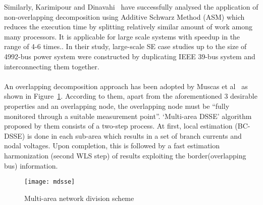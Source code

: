 \documentclass[thesis.tex]{subfiles}
\begin{document}
Similarly, Karimipour and Dinavahi~\cite{KarimipourDec} have successfully analysed the application of non-overlapping decomposition using Additive Schwarz Method (ASM) which reduces the execution time by splitting relatively similar amount of work among many processors. It is applicable for large scale systems with speedup in the range of 4-6 times.. In their study, large-scale SE case studies up to the size of 4992-bus power system were constructed by duplicating IEEE 39-bus system and interconnecting them together.\\\\
An overlapping decomposition approach has been adopted by Muscas et al~\cite{Muscas} as shown in Figure~\ref{fig:mdsse}. According to them, apart from the aforementioned 3 desirable properties and an overlapping node, the overlapping node must be “fully monitored through a suitable measurement point”. ‘Multi-area DSSE’ algorithm proposed by them consists of a two-step process. At first, local estimation (BC-DSSE) is done in each sub-area which results in a set of branch currents and nodal voltages. Upon completion, this is followed by a fast estimation harmonization (second WLS step) of results exploiting the border(overlapping bus) information.

\begin{figure}[H]
	\centering
	\texttt{[image: mdsse]}
	\caption{Multi-area network division scheme~\cite{Muscas}}
	\label{fig:mdsse}
\end{figure}



\subfilebib %
\end{document}
